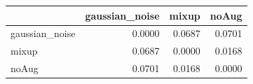 \begin{tabular}{lrrr}
\toprule
 & gaussian_noise & mixup & noAug \\
\midrule
gaussian_noise & 0.0000 & 0.0687 & 0.0701 \\
mixup & 0.0687 & 0.0000 & 0.0168 \\
noAug & 0.0701 & 0.0168 & 0.0000 \\
\bottomrule
\end{tabular}
